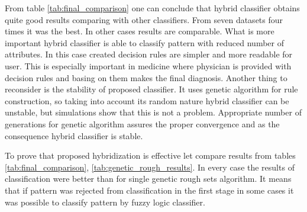 From table \ref{tab:final_comparison} one can conclude that hybrid classifier
obtains quite good results comparing with other classifiers. From seven
datasets four times it was the best. In other cases results are comparable.
What is more important hybrid classifier is able to classify pattern with
reduced number of attributes. In this case created decision rules are simpler
and more readable for user. This is especially important in medicine where
physician is provided with decision rules and basing on them makes the final
diagnosis. Another thing to reconsider is the stability of proposed classifier.
It uses genetic algorithm for rule construction, so taking into account its
random nature hybrid classifier can be unstable, but simulations show that this
is not a problem. Appropriate number of generations for genetic algorithm
assures the proper convergence and as the consequence hybrid classifier is stable. 

To prove that proposed hybridization is effective let compare results from
tables \ref{tab:final_comparison}, \ref{tab:genetic_rough_results}. In every
case the results of classification were better than for single genetic rough
sets algorithm. It means that if pattern was rejected from classification in
the first stage in some cases it was possible to classify pattern by fuzzy
logic classifier.

